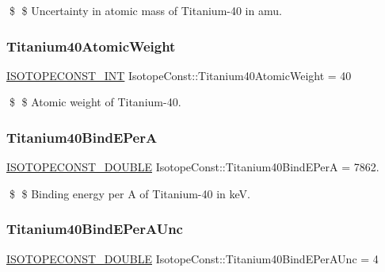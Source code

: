 \$ \$ Uncertainty in atomic mass of Titanium-\/40 in amu. \mbox{\label{group___isotope_const-_titanium-_ti40_ga096415e3d76d6afada6ac98f189ef0fc}} 
\subsubsection{\texorpdfstring{Titanium40\+Atomic\+Weight}{Titanium40AtomicWeight}}
{\footnotesize\ttfamily \mbox{\hyperlink{group___isotope_const-_macros_ga5f18360b3e99483a35c32d789e62621c}{I\+S\+O\+T\+O\+P\+E\+C\+O\+N\+S\+T\+\_\+\+I\+NT}} Isotope\+Const\+::\+Titanium40\+Atomic\+Weight = 40}

\$ \$ Atomic weight of Titanium-\/40. \mbox{\label{group___isotope_const-_titanium-_ti40_ga59f8d539cc567cd3153ca50f426473aa}} 
\subsubsection{\texorpdfstring{Titanium40\+Bind\+E\+PerA}{Titanium40BindEPerA}}
{\footnotesize\ttfamily \mbox{\hyperlink{group___isotope_const-_macros_ga8f45a7272ce02c0b4c65c44636ed719a}{I\+S\+O\+T\+O\+P\+E\+C\+O\+N\+S\+T\+\_\+\+D\+O\+U\+B\+LE}} Isotope\+Const\+::\+Titanium40\+Bind\+E\+PerA = 7862.}

\$ \$ Binding energy per A of Titanium-\/40 in keV. \mbox{\label{group___isotope_const-_titanium-_ti40_gab02b4926337c8c05a0cbce8948ce712e}} 
\subsubsection{\texorpdfstring{Titanium40\+Bind\+E\+Per\+A\+Unc}{Titanium40BindEPerAUnc}}
{\footnotesize\ttfamily \mbox{\hyperlink{group___isotope_const-_macros_ga8f45a7272ce02c0b4c65c44636ed719a}{I\+S\+O\+T\+O\+P\+E\+C\+O\+N\+S\+T\+\_\+\+D\+O\+U\+B\+LE}} Isotope\+Const\+::\+Titanium40\+Bind\+E\+Per\+A\+Unc = 4}

